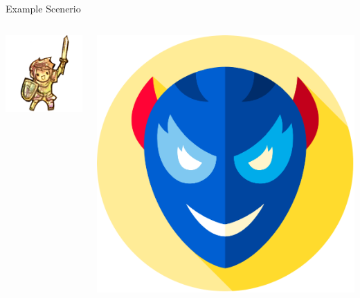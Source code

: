   \begin{frame}{Example Scenerio}
    \pause
    \begin{columns}
      \begin{column}{0.5\textwidth}
        \includegraphics[width=\textwidth]{images/hero.png}
      \end{column}
      \pause
      \begin{column}{0.5\textwidth}
        \includegraphics[width=\textwidth]{images/villain.png}
      \end{column}
    \end{columns}
  \end{frame}

